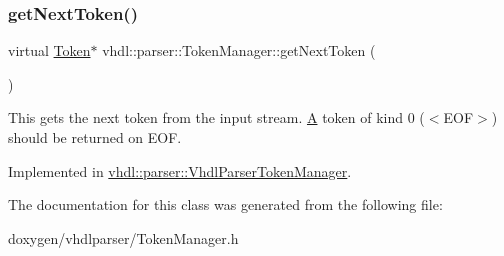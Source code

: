 \subsubsection{\texorpdfstring{getNextToken()}{getNextToken()}}
{\footnotesize\ttfamily virtual \mbox{\hyperlink{classvhdl_1_1parser_1_1_token}{Token}}$\ast$ vhdl\+::parser\+::\+Token\+Manager\+::get\+Next\+Token (\begin{DoxyParamCaption}{ }\end{DoxyParamCaption})\hspace{0.3cm}{\ttfamily [pure virtual]}}

This gets the next token from the input stream. \mbox{\hyperlink{class_a}{A}} token of kind 0 ($<$\+E\+O\+F$>$) should be returned on E\+OF. 

Implemented in \mbox{\hyperlink{classvhdl_1_1parser_1_1_vhdl_parser_token_manager_ac17f53300a62b7e188710e1c0bdbc1dc}{vhdl\+::parser\+::\+Vhdl\+Parser\+Token\+Manager}}.



The documentation for this class was generated from the following file\+:\begin{DoxyCompactItemize}
\item 
doxygen/vhdlparser/Token\+Manager.\+h\end{DoxyCompactItemize}
